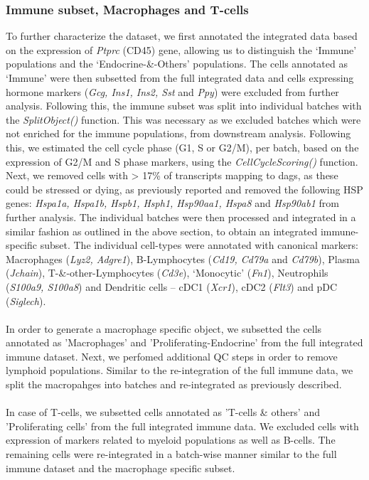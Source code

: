 \subsubsection{\large Immune subset, Macrophages and T-cells}
To further characterize the dataset, we first annotated the integrated data based on the expression of \textit{Ptprc} (CD45) gene, allowing us to distinguish the ‘Immune’ populations and the `Endocrine-\&-Others' populations. The cells annotated as `Immune' were then subsetted from the full integrated data and cells expressing hormone markers (\textit{Gcg, Ins1, Ins2, Sst} and \textit{Ppy}) were excluded from further analysis. Following this, the immune subset was split into individual batches with the \textit{SplitObject()} function. This was necessary as we excluded batches which were not enriched for the immune populations, from downstream analysis. Following this, we estimated the cell cycle phase (G1, S or G2/M), per batch, based on the expression of G2/M and S phase markers, using the \textit{CellCycleScoring()} function. Next, we removed cells with > 17\% of transcripts mapping to \glspl{dag}, as these could be stressed or dying, as previously reported \textbf{\cite{}} and removed the following HSP genes: \textit{Hspa1a, Hspa1b, Hspb1, Hsph1, Hsp90aa1, Hspa8} and \textit{Hsp90ab1}  from further analysis. The individual batches were then processed and integrated in a similar fashion as outlined in the above section, to obtain an integrated immune-specific subset. The individual cell-types were annotated with canonical markers: Macrophages (\textit{Lyz2, Adgre1}), B-Lymphocytes (\textit{Cd19, Cd79a} and \textit{Cd79b}), Plasma (\textit{Jchain}), T-\&-other-Lymphocytes (\textit{Cd3e}), `Monocytic’ (\textit{Fn1}), Neutrophils (\textit{S100a9, S100a8}) and Dendritic cells – cDC1 (\textit{Xcr1}), cDC2 (\textit{Flt3}) and pDC (\textit{Siglech}).\\\\
In order to generate a macrophage specific object, we subsetted the cells annotated as 'Macrophages' and 'Proliferating-Endocrine' from the full integrated immune dataset. Next, we perfomed additional QC steps in order to remove lymphoid populations. Similar to the re-integration of the full immune data, we split the macropahges into batches and re-integrated as previously described.\\\\ 
In case of T-cells, we subsetted cells annotated as 'T-cells \& others' and 'Proliferating cells' from the full integrated immune data. We excluded cells with expression of markers related to myeloid populations as well as B-cells. The remaining cells were re-integrated in a batch-wise manner similar to the full immune dataset and the macrophage specific subset.

